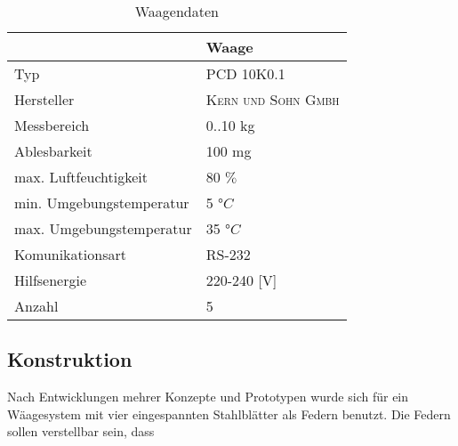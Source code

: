  
\begin{table}[htb]
\centering
\caption{Waagendaten}\vspace{6pt}
\label{tab:Messtechnik KA}
\begin{tabular}{ll}
\hline 
 & \textbf{Waage}  \\ 
\hline 
\hline 
Typ & PCD 10K0.1 \\ 
\hline 
Hersteller & \textsc{Kern und Sohn Gmbh} \\ 
\hline 
Messbereich & 0..10 kg \\ 
\hline 
Ablesbarkeit & 100 mg\\ 
\hline 
max. Luftfeuchtigkeit & 80 $\%$\\
\hline
min. Umgebungstemperatur & 5 $°C$\\
\hline
max. Umgebungstemperatur & 35 $°C$\\
\hline
Komunikationsart & RS-232 \\ 
\hline 
Hilfsenergie & 220-240  [V]  \\ 
\hline
Anzahl & 5 \\ 
\hline 
\hline 
\end{tabular} 
\label{tab:Tabelle}
\end{table}


\subsection{Konstruktion}
\label{subsec:Waagen-Konstruktion}


Nach Entwicklungen mehrer Konzepte und Prototypen wurde sich für ein Wäagesystem mit vier eingespannten Stahlblätter als Federn benutzt. Die Federn sollen verstellbar sein, dass 


